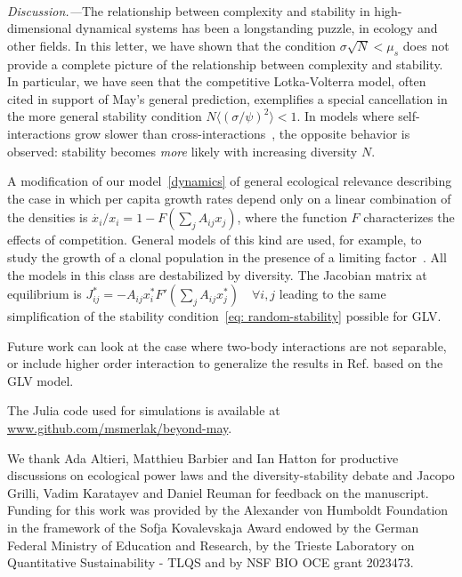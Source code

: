 \documentclass[
 prl,
 twocolumn,
 amsmath,
 amssymb,
 aps,
]{revtex4-2}
\begin{document}
\paragraph*{}
\emph{Discussion.---}The relationship between complexity and stability in high-dimensional dynamical systems has been a longstanding puzzle, in ecology and other fields. 
In this letter, we have shown that the condition $\sigma\sqrt{N}< \mu_s$ does not provide a complete picture of the relationship between complexity and stability. 
In particular, we have seen that the competitive Lotka-Volterra model, often cited in support of May's general prediction, exemplifies a special cancellation in the more general stability condition $N\langle (\sigma/\psi)^2\rangle < 1$.
In models where self-interactions grow slower than cross-interactions~\cite{Hatton2024,samadder2024interconnection}, the opposite behavior is observed: stability becomes \emph{more} likely with increasing diversity $N$.

A modification of our model~\eqref{dynamics} of general ecological relevance describing the case in which per capita growth rates depend only on a linear combination of the densities is $\dot{x_i}/x_i=1-F(\sum_jA_{ij}x_j)$, where the function $F$ characterizes the effects of competition.
General models of this kind are used, for example, to study the growth of a clonal population in the presence of a limiting factor~\cite{mazzolini2023universality}.
All the models in this class are destabilized by diversity.
The Jacobian matrix at equilibrium is $J_{ij}^*=-A_{ij}x_i^*F'(\sum_jA_{ij}x_j^*) \quad \forall i,j$ leading to the same simplification of the stability condition~\eqref{eq: random-stability} possible for GLV.

Future work can look at the case where two-body interactions are not separable, or include higher order interaction to generalize the results in Ref. \cite{Gibbs2022} based on the GLV model. 

\medskip

The Julia code used for simulations is available at \url{www.github.com/msmerlak/beyond-may}.

\medskip

\begin{acknowledgments}
We thank Ada Altieri, Matthieu Barbier and Ian Hatton for productive discussions on ecological power laws and the diversity-stability debate and Jacopo Grilli, Vadim Karatayev and Daniel Reuman for feedback on the manuscript.
Funding for this work was provided by the Alexander von Humboldt Foundation in the framework of the Sofja Kovalevskaja Award endowed by the German Federal Ministry of Education and Research, by the Trieste Laboratory on Quantitative Sustainability - TLQS and by NSF BIO OCE grant 2023473.
\end{acknowledgments}

\medskip



\end{document}
